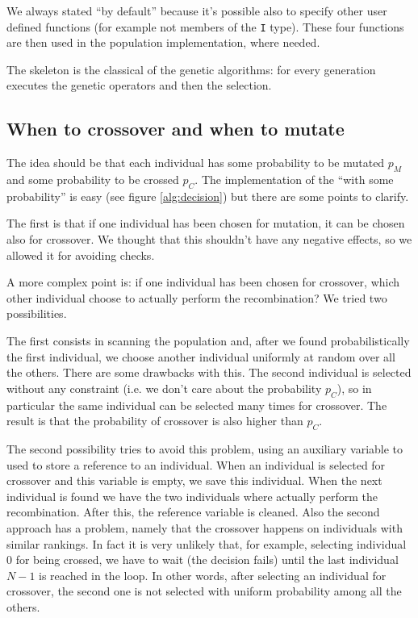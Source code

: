\documentclass{report}
\begin{document}
We always stated ``by default'' because it's possible also to specify other user defined functions (for example not members of the \texttt{I} type). These four functions are then used in the population implementation, where needed.

The skeleton is the classical of the genetic algorithms: for every generation executes the genetic operators and then the selection.

\subsection{When to crossover and when to mutate}

The idea should be that each individual has some probability to be mutated $p_M$ and some probability to be crossed $p_C$. The implementation of the ``with some probability'' is easy (see figure \ref{alg:decision}) but there are some points to clarify.

The first is that if one individual has been chosen for mutation, it can be chosen also for crossover. We thought that this shouldn't have any negative effects, so we allowed it for avoiding checks.

A more complex point is: if one individual has been chosen for crossover, which other individual choose to actually perform the recombination? We tried two possibilities.

The first consists in scanning the population and, after we found probabilistically the first individual, we choose another individual uniformly at random over all the others. There are some drawbacks with this. The second individual is selected without any constraint (i.e. we don't care about the probability $p_C$), so in particular the same individual can be selected many times for crossover. The result is that the probability of crossover is also higher than $p_C$.

The second possibility tries to avoid this problem, using an auxiliary variable to used to store a reference to an individual. When an individual is selected for crossover and this variable is empty, we save this individual. When the next individual is found we have the two individuals where actually perform the recombination. After this, the reference variable is cleaned. Also the second approach has a problem, namely that the crossover happens on individuals with similar rankings. In fact it is very unlikely that, for example, selecting individual 0 for being crossed, we have to wait (the decision fails) until the last individual $N-1$ is reached in the loop. In other words, after selecting an individual for crossover, the second one is not selected with uniform probability among all the others.
\end{document}
